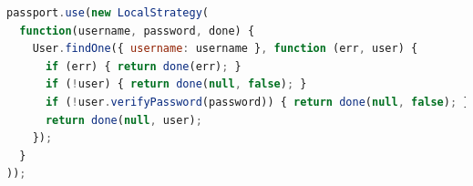 \begin{lstlisting}[language=JavaScript, caption=\selectlanguage{greek}Βασικό \selectlanguage{english}boilerplate\selectlanguage{greek} της \selectlanguage{english}Local Strategy\selectlanguage{greek} στην εφαρμογή]
passport.use(new LocalStrategy(
  function(username, password, done) {
    User.findOne({ username: username }, function (err, user) {
      if (err) { return done(err); }
      if (!user) { return done(null, false); }
      if (!user.verifyPassword(password)) { return done(null, false); }
      return done(null, user);
    });
  }
));
\end{lstlisting}
